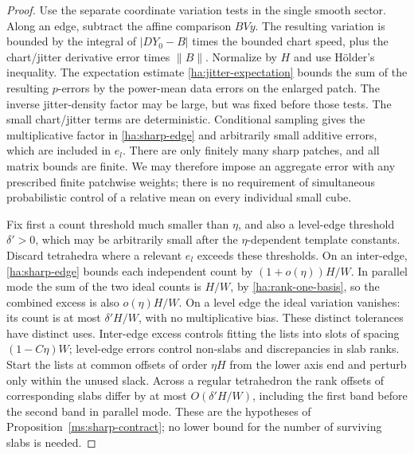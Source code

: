\documentclass[11pt]{article}
\numberwithin{equation}{section}
\theoremstyle{definition}
\theoremstyle{remark}
\begin{document}
\begin{proof}
Use the separate coordinate variation tests in the single smooth
sector.  Along an edge, subtract the affine comparison $BVy$.
The resulting variation is bounded by the integral of
$|DY_0-B|$ times the bounded chart speed, plus the chart/jitter
derivative error times $\|B\|$.  Normalize by $H$ and use
H\"older's inequality.  The expectation estimate
\eqref{ha:jitter-expectation} bounds the sum of the resulting
$p$-errors by the power-mean data errors on the enlarged patch.
The inverse jitter-density factor may be large, but was fixed before
those tests.  The small chart/jitter terms are deterministic.
Conditional sampling gives the multiplicative factor in
\eqref{ha:sharp-edge} and arbitrarily small additive errors, which
are included in $e_l$.  There are only finitely many sharp patches,
and all matrix bounds are finite.  We may therefore impose an
aggregate error with any prescribed finite patchwise weights;
there is no requirement of simultaneous probabilistic control of a
relative mean on every individual small cube.

Fix first a count threshold much smaller than $\eta$, and also a
level-edge threshold $\delta'>0$, which may be arbitrarily small
after the $\eta$-dependent template constants.  Discard tetrahedra
where a relevant $e_l$ exceeds these thresholds.  On an inter-edge,
\eqref{ha:sharp-edge} bounds each independent count by
$(1+o(\eta))H/W$.  In parallel mode the sum of the two ideal counts
is $H/W$, by \eqref{ha:rank-one-basis}, so the combined excess is
also $o(\eta)H/W$.  On a level edge the ideal variation vanishes:
its count is at most $\delta'H/W$, with no multiplicative bias.
These distinct tolerances have distinct uses.  Inter-edge excess
controls fitting the lists into slots of spacing $(1-C\eta)W$;
level-edge errors control non-slabs and discrepancies in slab ranks.
Start the lists at common offsets of order $\eta H$ from the lower
axis end and perturb only within the unused slack.  Across a
regular tetrahedron the rank offsets of corresponding slabs differ
by at most $O(\delta'H/W)$, including the first band before the
second band in parallel mode.  These are the hypotheses of
Proposition~\ref{ms:sharp-contract}; no lower bound for the number
of surviving slabs is needed.


\end{proof}
\end{document}
